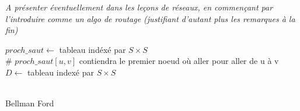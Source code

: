 
\textit{A présenter éventuellement dans les leçons de réseaux, en commençant par l'introduire comme un algo de routage (justifiant d'autant plus les remarques à la fin)}

\begin{algorithm}[H]
	
	$proch\_saut \gets$ tableau indéxé par $S\times S$\\
	\# $proch\_saut[u,v]$ contiendra le premier noeud où aller pour aller de u à v\\
	$D \gets$ tableau indexé par $S\times S$\\
	\enspace\\
	
	
	\caption{Bellman Ford}
\end{algorithm}

